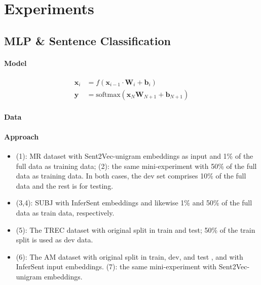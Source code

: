 \documentclass[11pt,a4paper]{article}
\begin{document}
\section{Experiments}

\subsection{MLP \& Sentence Classification}

\paragraph{Model}

\begin{align*}
  \mathbf{x}_i &= f(\mathbf{x}_{i-1}\cdot \mathbf{W}_i+\mathbf{b}_i)\\
  \mathbf{y} &= \text{softmax}(\mathbf{x}_{N}\mathbf{W}_{N+1}+\mathbf{b}_{N+1})
\end{align*}

\paragraph{Data}



\paragraph{Approach}

\begin{itemize}[noitemsep,leftmargin=0.6cm]
  \item (1): MR dataset with Sent2Vec-unigram embeddings as input and 1\% of the full data as training data; (2): the same mini-experiment with 50\% of the full data as training data. In both cases, the dev set comprises 10\% of the full data and the rest is for testing.
  \item (3,4): SUBJ with InferSent embeddings and likewise 1\% and 50\% of the full data as train data, respectively.
  \item (5): The TREC dataset with original split in train and test; 50\% of the train split is used as dev data.
  \item (6): The AM dataset with original split in train, dev, and test \cite{Eger:2017}, and with InferSent input embeddings. (7): the same mini-experiment with Sent2Vec-unigram embeddings.
\end{itemize}


\end{document}
